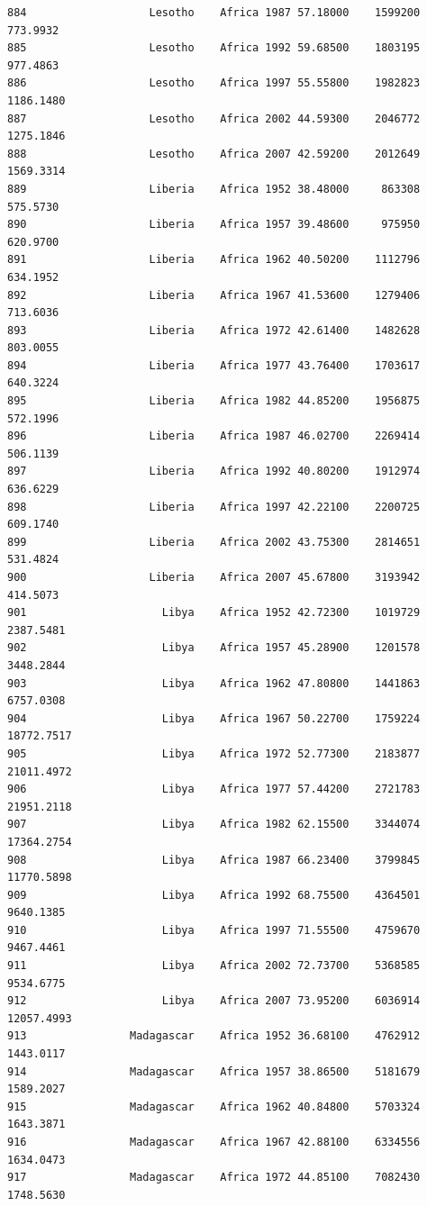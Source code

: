 \documentclass[
  letterpaper,
  DIV=11,
  numbers=noendperiod]{scrreprt}
\begin{document}
\begin{verbatim}
884                   Lesotho    Africa 1987 57.18000    1599200    773.9932
885                   Lesotho    Africa 1992 59.68500    1803195    977.4863
886                   Lesotho    Africa 1997 55.55800    1982823   1186.1480
887                   Lesotho    Africa 2002 44.59300    2046772   1275.1846
888                   Lesotho    Africa 2007 42.59200    2012649   1569.3314
889                   Liberia    Africa 1952 38.48000     863308    575.5730
890                   Liberia    Africa 1957 39.48600     975950    620.9700
891                   Liberia    Africa 1962 40.50200    1112796    634.1952
892                   Liberia    Africa 1967 41.53600    1279406    713.6036
893                   Liberia    Africa 1972 42.61400    1482628    803.0055
894                   Liberia    Africa 1977 43.76400    1703617    640.3224
895                   Liberia    Africa 1982 44.85200    1956875    572.1996
896                   Liberia    Africa 1987 46.02700    2269414    506.1139
897                   Liberia    Africa 1992 40.80200    1912974    636.6229
898                   Liberia    Africa 1997 42.22100    2200725    609.1740
899                   Liberia    Africa 2002 43.75300    2814651    531.4824
900                   Liberia    Africa 2007 45.67800    3193942    414.5073
901                     Libya    Africa 1952 42.72300    1019729   2387.5481
902                     Libya    Africa 1957 45.28900    1201578   3448.2844
903                     Libya    Africa 1962 47.80800    1441863   6757.0308
904                     Libya    Africa 1967 50.22700    1759224  18772.7517
905                     Libya    Africa 1972 52.77300    2183877  21011.4972
906                     Libya    Africa 1977 57.44200    2721783  21951.2118
907                     Libya    Africa 1982 62.15500    3344074  17364.2754
908                     Libya    Africa 1987 66.23400    3799845  11770.5898
909                     Libya    Africa 1992 68.75500    4364501   9640.1385
910                     Libya    Africa 1997 71.55500    4759670   9467.4461
911                     Libya    Africa 2002 72.73700    5368585   9534.6775
912                     Libya    Africa 2007 73.95200    6036914  12057.4993
913                Madagascar    Africa 1952 36.68100    4762912   1443.0117
914                Madagascar    Africa 1957 38.86500    5181679   1589.2027
915                Madagascar    Africa 1962 40.84800    5703324   1643.3871
916                Madagascar    Africa 1967 42.88100    6334556   1634.0473
917                Madagascar    Africa 1972 44.85100    7082430   1748.5630

\end{verbatim}
\end{document}
